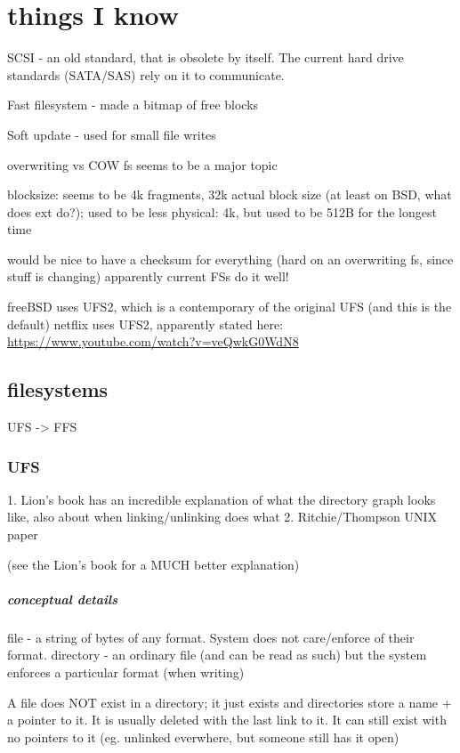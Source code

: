 \documentclass[a4paper]{report}
\begin{document}
\chapter{things I know}
    SCSI - an old standard, that is obsolete by itself. The current hard drive standards (SATA/SAS) rely on it to communicate.

    Fast filesystem - made a bitmap of free blocks

    Soft update - used for small file writes

    overwriting vs COW fs seems to be a major topic

    blocksize: seems to be 4k fragments, 32k actual block size (at least on BSD, what does ext do?); used to be less
    physical: 4k, but used to be 512B for the longest time

    would be nice to have a checksum for everything (hard on an overwriting fs, since stuff is changing)
    apparently current FSs do it well!

    freeBSD uses UFS2, which is a contemporary of the original UFS (and this is the default)
    netflix uses UFS2, apparently stated here: \url{https://www.youtube.com/watch?v=veQwkG0WdN8}
\section{filesystems}
    UFS -> FFS
    \subsection{UFS}
        1. Lion's book has an incredible explanation of what the directory graph
        looks like, also about when linking/unlinking does what
        2. Ritchie/Thompson UNIX paper

        (see the Lion's book for a MUCH better explanation)
        \paragraph{conceptual details}
        file - a string of bytes of any format. System does not care/enforce of
        their format.
        directory - an ordinary file (and can be read as such) but the system
        enforces a particular format (when writing)

        A file does NOT exist in a directory; it just exists and directories
        store a name + a pointer to it. It is usually deleted with the last
        link to it. It can still exist with no pointers to it (eg. unlinked
        everwhere, but someone still has it open)
\end{document}
